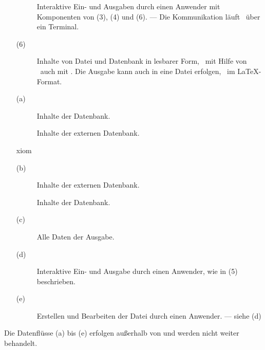 \begin{itemize}
\begin{description}
		\item[]\label{dat-mitAnwender}
		Interaktive Ein- und Ausgaben durch einen Anwender mit Komponenten von (3), (4) und (6).
		--- Die Kommunikation läuft \textiAlg\ über ein Terminal.
	\end{description}
	\item[(6)]\label{dat-Ausgabe}
	\begin{description}
		\item[]\label{dat-inAusgabe}
		Inhalte von Datei und Datenbank in lesbarer Form, \textua\ mit Hilfe von \Ausgabeschemata\ auch mit \Formeln.
		Die Ausgabe kann auch in eine Datei erfolgen,
		\textzB\ im \LaTeX-Format.
	\end{description}
	\item[(a)]\label{dat-extInternet}
	\begin{description}
		\item[]\label{dat-ausextInternet}
		Inhalte der Datenbank.
		\item[]\label{dat-inextInternet}
		Inhalte der externen Datenbank.
	\end{description}
xiom	\item[(b)]\label{dat-extDatenbank}
	\begin{description}
		\item[]
		\label{dat-ausextDatenbank} Inhalte der externen Datenbank.
		\item[]
		\label{dat-inextDatenbank} Inhalte der Datenbank.
	\end{description}
	\item[(c)]\label{dat-AusgabeAnwender}
	\begin{description}
		\item[]\label{dat-Ausgabe2Anwender}
		Alle Daten der Ausgabe.
	\end{description}
	\item[(d)] \label{dat-AnwenderTerminal}
	\begin{description}
		\item[]\label{dat-Anwender22Terminal}
		Interaktive Ein- und Ausgabe durch einen Anwender, wie in (5) beschrieben.
	\end{description}
	\item[(e)] \label{dat-TerminalDatei}
	\begin{description}
		\item[]\label{dat-Terminal22Datei}
		Erstellen und Bearbeiten der Datei durch einen Anwender.
		--- siehe (d)
	\end{description}
\end{itemize}
Die Datenflüsse (a) bis (e) erfolgen außerhalb von \ASBA
und werden nicht weiter behandelt.

